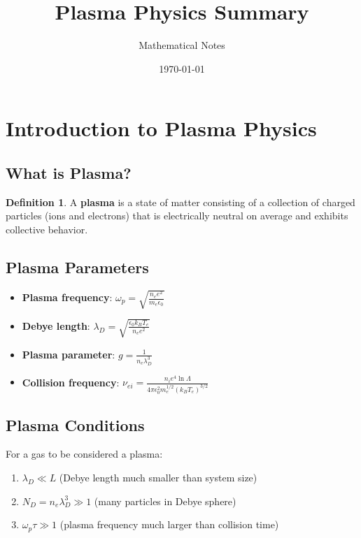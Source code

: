 \documentclass[11pt]{article}
\title{Plasma Physics Summary}
\author{Mathematical Notes}
\date{\today}
\theoremstyle{definition}
\newtheorem{definition}{Definition}[section]
\begin{document}
\maketitle

\tableofcontents
\newpage

\section{Introduction to Plasma Physics}

\subsection{What is Plasma?}
\begin{definition}
A \textbf{plasma} is a state of matter consisting of a collection of charged particles (ions and electrons) that is electrically neutral on average and exhibits collective behavior.
\end{definition}

\subsection{Plasma Parameters}
\begin{itemize}
    \item \textbf{Plasma frequency}: $\omega_p = \sqrt{\frac{n_e e^2}{m_e \epsilon_0}}$
    \item \textbf{Debye length}: $\lambda_D = \sqrt{\frac{\epsilon_0 k_B T_e}{n_e e^2}}$
    \item \textbf{Plasma parameter}: $g = \frac{1}{n_e \lambda_D^3}$
    \item \textbf{Collision frequency}: $\nu_{ei} = \frac{n_i e^4 \ln\Lambda}{4\pi \epsilon_0^2 m_e^{1/2} (k_B T_e)^{3/2}}$
\end{itemize}

\subsection{Plasma Conditions}
For a gas to be considered a plasma:
\begin{enumerate}
    \item $\lambda_D \ll L$ (Debye length much smaller than system size)
    \item $N_D = n_e \lambda_D^3 \gg 1$ (many particles in Debye sphere)
    \item $\omega_p \tau \gg 1$ (plasma frequency much larger than collision time)
\end{enumerate}
\end{document}
